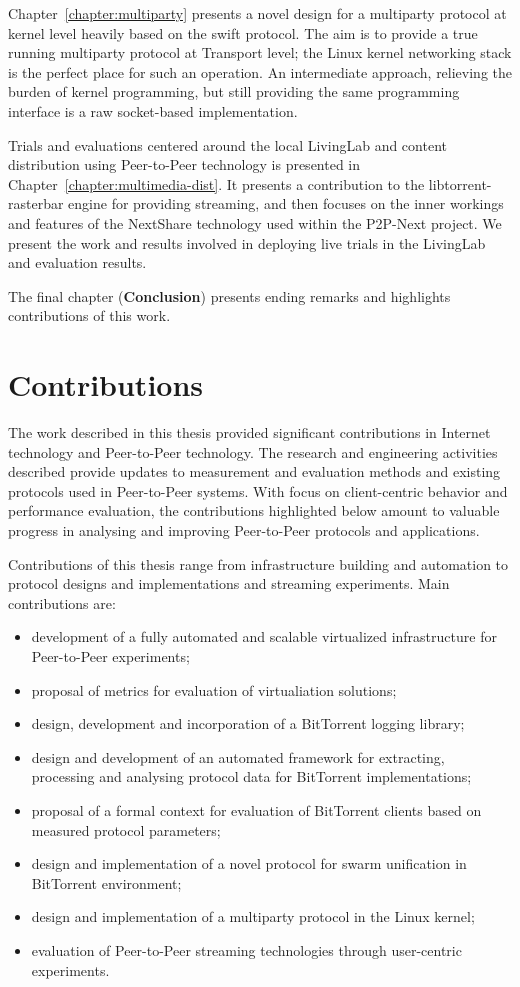 Chapter~\ref{chapter:multiparty} presents a novel design for a multiparty
protocol at kernel level heavily based on the swift protocol. The aim is to
provide a true running multiparty protocol at Transport level; the Linux
kernel networking stack is the perfect place for such an operation. An
intermediate approach, relieving the burden of kernel programming, but still
providing the same programming interface is a raw socket-based implementation.

Trials and evaluations centered around the local LivingLab and content
distribution using Peer-to-Peer technology is presented in
Chapter~\ref{chapter:multimedia-dist}. It presents a contribution to the
libtorrent-rasterbar engine for providing streaming, and then focuses on the
inner workings and features of the NextShare technology used within the
P2P-Next project. We present the work and results involved in deploying live
trials in the LivingLab and evaluation results.

The final chapter (\textbf{Conclusion}) presents ending remarks and
highlights contributions of this work.

\section{Contributions}
\label{sec:conclusion:contributions}

The work described in this thesis provided significant contributions in
Internet technology and Peer-to-Peer technology. The research and engineering
activities described provide updates to measurement and evaluation methods and
existing protocols used in Peer-to-Peer systems. With focus on client-centric
behavior and performance evaluation, the contributions highlighted below
amount to valuable progress in analysing and improving Peer-to-Peer protocols
and applications.

Contributions of this thesis range from infrastructure building and automation
to protocol designs and implementations and streaming experiments. Main
contributions are:
\begin{itemize}
  \item development of a fully automated and scalable virtualized
  infrastructure for Peer-to-Peer experiments;
  \item proposal of metrics for evaluation of virtualiation solutions;
  \item design, development and incorporation of a BitTorrent logging library;
  \item design and development of an automated framework for extracting,
  processing and analysing protocol data for BitTorrent implementations;
  \item proposal of a formal context for evaluation of BitTorrent clients
  based on measured protocol parameters;
  \item design and implementation of a novel protocol for swarm unification in
  BitTorrent environment;
  \item design and implementation of a multiparty protocol in the Linux
  kernel;
  \item evaluation of Peer-to-Peer streaming technologies through user-centric
  experiments.
\end{itemize}

